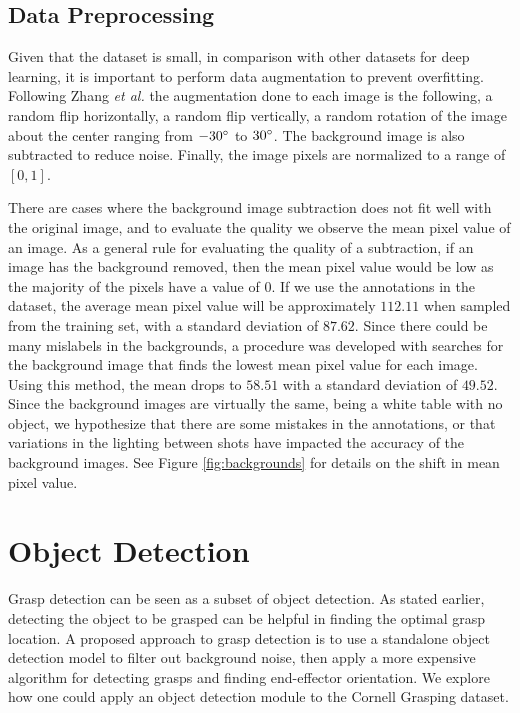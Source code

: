 \documentclass{article}
\begin{document}
\subsection{Data Preprocessing}
Given that the dataset is small, in comparison with other datasets for deep
learning, it is important to perform data augmentation to prevent overfitting.
Following Zhang \textit{et al.} \cite{zhang18} the augmentation done to each
image is the following, a random flip horizontally, a random flip vertically,
a random rotation of the image about the center ranging from $-30\degree$ to
$30\degree$. The background image is also subtracted to reduce noise. Finally,
the image pixels are normalized to a range of $[0,1]$.

There are cases where the background image subtraction does not fit well with the
original image, and to evaluate the quality we observe the mean pixel value of an
image. As a general rule for evaluating the quality of a subtraction, if an image
has the background removed, then the mean pixel value would be low as the
majority of the pixels have a value of $0$.
If we use the annotations in the dataset, the average
mean pixel value will be approximately $112.11$ when sampled from the training set,
with a standard deviation of $87.62$. Since there could be many mislabels in the
backgrounds, a procedure was developed with searches for the background image that
finds the lowest mean pixel value for each image. Using this method, the mean
drops to $58.51$ with a standard deviation of $49.52$. Since the background images are
virtually the same, being a white table with no object, we hypothesize that there
are some mistakes in the annotations, or that variations in the lighting between shots
have impacted the accuracy of the background images. See Figure \ref{fig:backgrounds} for
details on the shift in mean pixel value.

\newpage
\section{Object Detection}
Grasp detection can be seen as a subset of object detection.
As stated earlier, detecting the object to be grasped can be helpful in finding the
optimal grasp location. A proposed approach to grasp detection is to use a standalone
object detection model to filter out background noise, then apply a more expensive
algorithm for detecting grasps and finding end-effector orientation. We explore how
one could apply an object detection module to the Cornell Grasping dataset.
\end{document}
